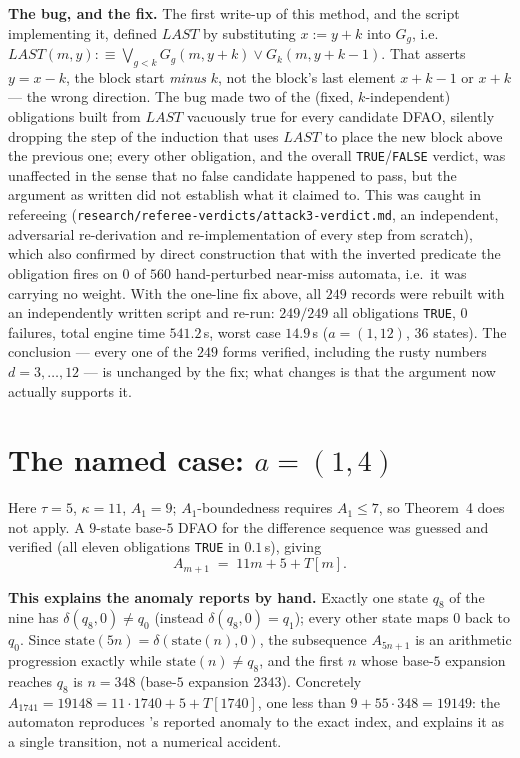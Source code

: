 \documentclass[10pt,reqno]{amsart}
\theoremstyle{plain}
\theoremstyle{definition}
\theoremstyle{remark}
\numberwithin{theorem}{section}
\begin{document}
\textbf{The bug, and the fix.} The first write-up of this method, and the script implementing
it, defined $LAST$ by substituting $x:=y+k$ into $G_g$, i.e.\ $LAST(m,y):\equiv\bigvee_{g<k}
G_g(m,y+k)\vee G_k(m,y+k-1)$. That asserts $y=x-k$, the block start \emph{minus} $k$, not the
block's last element $x+k-1$ or $x+k$ --- the wrong direction. The bug made two of the (fixed,
$k$-independent) obligations built from $LAST$ vacuously true for every candidate DFAO, silently
dropping
the step of the induction that uses $LAST$ to place the new block above the previous one; every
other obligation, and the overall \texttt{TRUE}/\texttt{FALSE} verdict, was unaffected in the
sense that no false candidate happened to pass, but the argument as written did not establish
what it claimed to. This was caught in refereeing (\texttt{research/referee-verdicts/attack3-verdict.md}, an
independent, adversarial re-derivation and re-implementation of every step from scratch), which
also confirmed by direct construction that with the inverted predicate the obligation fires on
$0$ of $560$ hand-perturbed near-miss automata, i.e.\ it was carrying no weight. With the
one-line fix above, all $249$ records were rebuilt with an independently written script and
re-run: $249/249$ all obligations \texttt{TRUE}, $0$ failures, total engine time
$541.2$\,s, worst case $14.9$\,s ($a=(1,12)$, $36$ states). The conclusion --- every one of the
$249$ forms verified, including the rusty numbers $d=3,\dots,12$ --- is unchanged by the fix;
what changes is that the argument now actually supports it.

\section{The named case: $a=(1,4)$}
\label{sec:rusty4}

Here $\tau=5$, $\kappa=11$, $A_1=9$; $A_1$-boundedness requires $A_1\le7$, so Theorem~4 does not
apply. A $9$-state base-$5$ DFAO for the difference sequence was guessed and verified (all
eleven obligations \texttt{TRUE} in $0.1$\,s), giving
\[
  A_{m+1} \;=\; 11m+5+T[m].
\]

\textbf{This explains the anomaly \cite{FJ} reports by hand.} Exactly one state $q_8$ of the
nine has $\delta(q_8,0)\ne q_0$ (instead $\delta(q_8,0)=q_1$); every other state maps $0$ back to
$q_0$. Since $\mathrm{state}(5n)=\delta(\mathrm{state}(n),0)$, the subsequence $A_{5n+1}$ is an
arithmetic progression exactly while $\mathrm{state}(n)\ne q_8$, and the first $n$ whose
base-$5$ expansion reaches $q_8$ is $n=348$ (base-$5$ expansion $2343$). Concretely
$A_{1741}=19148=11\cdot1740+5+T[1740]$, one less than $9+55\cdot348=19149$: the automaton
reproduces \cite{FJ}'s reported anomaly to the exact index, and explains it as a single
transition, not a numerical accident.
\end{document}

